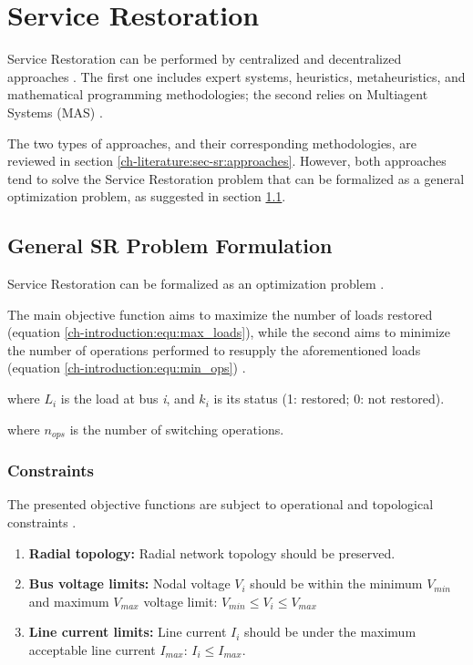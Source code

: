 \section{Service Restoration}
\label{ch-literature:sec:sr}
Service Restoration can be performed by centralized and decentralized approaches \cite{Zidan2017}\cite{Yip2017}.
The first one includes expert systems, heuristics, metaheuristics, and mathematical programming methodologies; 
the second relies on Multiagent Systems (MAS) \cite{Chellaswamy2019}. 

The two types of approaches, and their corresponding methodologies, are reviewed in section \ref{ch-literature:sec-sr:approaches}. 
However, both approaches tend to solve the Service Restoration problem that can be 
formalized as a general optimization problem, as suggested in section \ref{ch-literature:sec-sr:problem_formulation}. 


\subsection{General SR Problem Formulation}
\label{ch-literature:sec-sr:problem_formulation}
Service Restoration can be formalized as an optimization problem \cite{Huang2016}. 

The main objective function aims to maximize the number of loads restored (equation 
\ref{ch-introduction:equ:max_loads}), while the second aims to minimize the number of operations performed 
to resupply the aforementioned loads (equation \ref{ch-introduction:equ:min_ops}) \cite{Shen2018}. 


where $L_i$ is the load at bus \textit{i}, and $k_i$ is its status (1: restored; 0: not restored).

where $n_{ops}$ is the number of switching operations. 

\subsubsection*{Constraints}
The presented objective functions are subject to operational and topological constraints \cite{Abu-Elanien2018}. 

\begin{enumerate}
    \item \textbf{Radial topology:} Radial network topology should be preserved.
    \item \textbf{Bus voltage limits:} Nodal voltage $V_i$ should be within the minimum $V_{min}$ and maximum $V_{max}$ voltage limit: $V_{min} \leq V_i \leq V_{max}$ 
    \item \textbf{Line current limits:} Line current $I_i$ should be under the maximum acceptable line current $ I_{max}$: $I_i \leq I_{max}$.
\end{enumerate}

